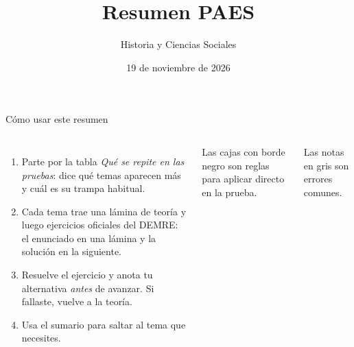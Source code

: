 \documentclass[aspectratio=169,11pt]{beamer}
\title[Resumen PAES: Historia y Ciencias Sociales]{Resumen PAES}
\subtitle{Historia y Ciencias Sociales}
\date{19 de noviembre de 2026}
\begin{document}
\begin{frame}[plain]
  \titlepage
\end{frame}

\begin{frame}{Cómo usar este resumen}
\begin{columns}[T,onlytextwidth]
\small
\begin{enumerate}
\item Parte por la tabla \emph{Qué se repite en las pruebas}: dice qué temas aparecen más y cuál es su trampa habitual.
\item Cada tema trae una lámina de teoría y luego ejercicios oficiales del DEMRE: el enunciado en una lámina y la solución en la siguiente.
\item Resuelve el ejercicio y anota tu alternativa \emph{antes} de avanzar. Si fallaste, vuelve a la teoría.
\item Usa el sumario para saltar al tema que necesites.
\end{enumerate}
\begin{cajaregla}\footnotesize Las cajas con borde negro son reglas para aplicar directo en la prueba.\end{cajaregla}
\begin{notagris}\footnotesize Las notas en gris son errores comunes.\end{notagris}
\end{columns}
\end{frame}
\end{document}
